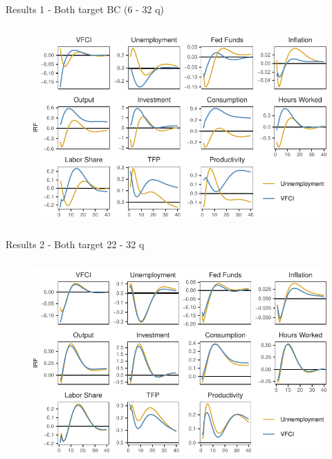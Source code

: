 \begin{frame}{Results 1 - Both target BC (6 - 32 q)}
    
    \label{BCA_MBC}

    \vspace{-0.25cm}

    \begin{figure}
        \includegraphics[height = 3in]{figs/fig3_BCA_MBC.pdf}
    \end{figure}

\end{frame}



\begin{frame}{Results 2 - Both target 22 - 32 q}
    
    \label{results-2}

    \vspace{-0.25cm}

    \begin{figure}
        \includegraphics[height = 3in]{figs/fig5_vfci_u_same_freq.pdf}
    \end{figure}

\end{frame}


